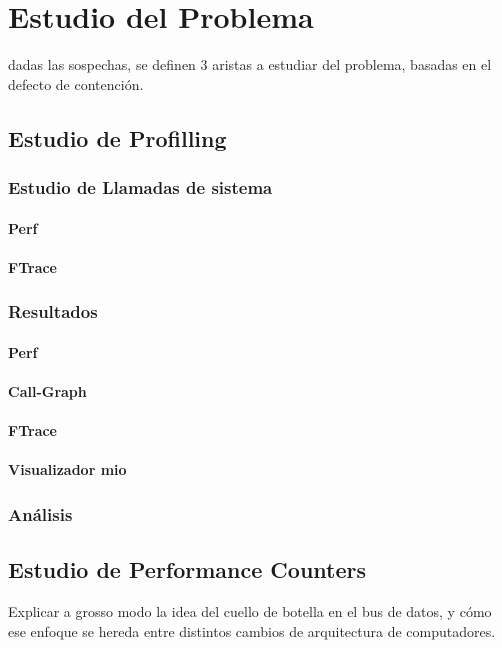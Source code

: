 \chapter{Estudio del Problema}

dadas las sospechas, se definen 3 aristas a estudiar del problema, basadas en el defecto de contención.

\section{Estudio de Profilling}
\subsection{Estudio de Llamadas de sistema}
\subsubsection{Perf}
\subsubsection{FTrace}
\subsection{Resultados}
\subsubsection{Perf}
\subsubsection{Call-Graph}
\subsubsection{FTrace}
\subsubsection{Visualizador mio}
\subsection{Análisis}

\section{Estudio de Performance Counters}
Explicar a grosso modo la idea del cuello de botella en el bus de datos, y cómo ese enfoque se hereda entre distintos cambios de arquitectura de computadores.

